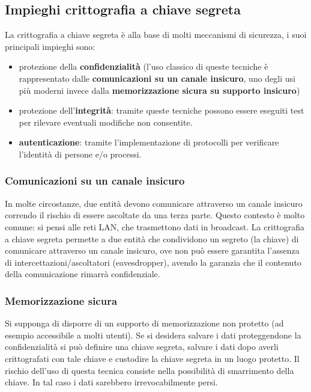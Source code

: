 \subsection{Impieghi crittografia a chiave segreta}
La crittografia a chiave segreta è alla base di molti meccanismi di sicurezza, i suoi principali impieghi sono: 
\begin{itemize}
  \item protezione della \textbf{confidenzialità} (l'uso classico di queste tecniche è rappresentato dalle \textbf{comunicazioni su un canale insicuro}, uno degli usi più moderni invece dalla \textbf{memorizzazione sicura su supporto insicuro})
  \item protezione dell'\textbf{integrità}: tramite queste tecniche possono essere eseguiti test per rilevare eventuali modifiche non consentite.
  \item \textbf{autenticazione}: tramite l'implementazione di protocolli per verificare l'identità di persone e/o processi.
\end{itemize}

\subsubsection{Comunicazioni su un canale insicuro}
In molte circostanze, due entità devono comunicare attraverso un canale insicuro correndo il rischio di essere ascoltate da una terza parte. Questo contesto è molto comune: si pensi alle reti LAN, che trasmettono dati in broadcast. La crittografia a chiave segreta permette a due entità che condividono un segreto (la chiave) di comunicare attraverso un canale insicuro, ove non può essere garantita l'assenza di intercettazioni/ascoltatori (eavesdropper), avendo la garanzia che il contenuto della comunicazione rimarrà confidenziale.

\subsubsection{Memorizzazione sicura}
Si supponga di disporre di un supporto di memorizzazione non protetto (ad esempio accessibile a molti utenti). Se si desidera salvare i dati proteggendone la confidenzialità si può definire una chiave segreta, salvare i dati dopo averli crittografati con tale chiave e custodire la chiave segreta in un luogo protetto. Il rischio dell'uso di questa tecnica consiste nella possibilità di smarrimento della chiave. In tal caso i dati sarebbero irrevocabilmente persi.

